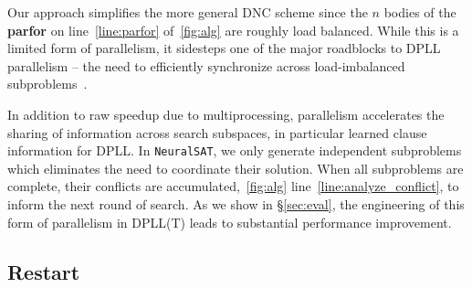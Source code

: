 \documentclass[oneside,11pt,dvipsnames]{book}
\numberwithin{equation}{section}
\theoremstyle{definition}
\theoremstyle{remark}
\newcommand{\tool}{\texttt{NeuralSAT}}
\begin{document}
Our approach simplifies the more general DNC scheme since the $n$ bodies of the \textbf{parfor} on line~\ref{line:parfor} of~\autoref{fig:alg} are roughly load balanced.
While this is a limited form of parallelism, it sidesteps one of the major roadblocks to DPLL parallelism -- the need to efficiently synchronize across load-imbalanced subproblems~\cite{le2017painless,le2019modular}.

In addition to raw speedup due to multiprocessing, parallelism accelerates the sharing of information across search subspaces, in particular learned clause information for DPLL. In \tool{}, we only generate independent subproblems which eliminates the need to coordinate their solution. When all subproblems are complete, their conflicts are accumulated,~\autoref{fig:alg} line~\ref{line:analyze_conflict},  to inform the next round of search.
As we show in \S\ref{sec:eval}, the engineering of this form of parallelism in DPLL(T) leads to substantial performance improvement.

\subsection{Restart}









\end{document}
